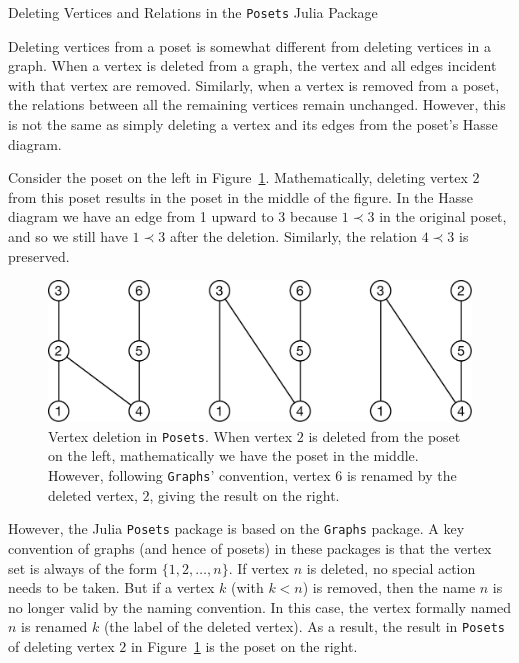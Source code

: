 \documentclass[12pt]{article}
\begin{document}
\begin{center}
  \large
  Deleting Vertices and Relations in the \texttt{Posets} Julia Package
\end{center}


Deleting vertices from a poset is somewhat different from deleting
vertices in a graph. When a vertex is deleted from a graph, the vertex
and all edges incident with that vertex are removed. Similarly, when
a vertex is removed from a poset, the relations between all the
remaining vertices remain unchanged. However, this is not the same as
simply deleting a vertex and its edges from the poset's Hasse
diagram. 

Consider the poset on the left in Figure~\ref{fig:vertex-deletion}. 
Mathematically, deleting vertex $2$ from this poset results in the
poset in the middle of the figure. In the Hasse diagram we have an
edge from 1 upward to 3 because $1\prec 3$ in the original poset, and
so we still have $1 \prec 3$ after the deletion. Similarly, the
relation $4\prec3$ is preserved.

\begin{figure}[h]
\begin{framed}
  \begin{center}
    \includegraphics[scale=0.3]{vertex-deletion}
  \end{center}
  \caption{Vertex deletion in \texttt{Posets}. When vertex $2$ is
    deleted from the poset on the left, mathematically we have the
    poset in the middle.  However, following \texttt{Graphs}'
    convention, vertex $6$ is renamed by the deleted vertex, $2$,
    giving the result on the right.}
  \label{fig:vertex-deletion}
\end{framed}
\end{figure}

However, the Julia \texttt{Posets} package is based on the
\texttt{Graphs} package. A key convention of graphs (and hence of
posets) in these packages is that the vertex set is always of the form
$\{1,2,\ldots,n\}$. If vertex $n$ is deleted, no special action needs
to be taken. But if a vertex $k$ (with $k<n$) is removed, then the
name $n$ is no longer valid by the naming convention. In this case,
the vertex formally named $n$ is renamed $k$ (the label of the deleted
vertex). As a result, the result in \texttt{Posets} of deleting vertex
$2$ in Figure~\ref{fig:vertex-deletion} is the poset on the right.
\end{document}
